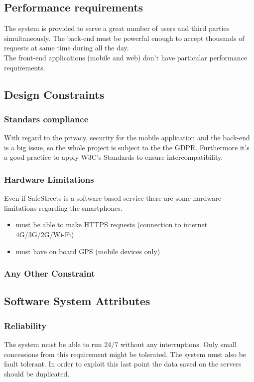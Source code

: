 \documentclass{article}
\begin{document}
\subsection{Performance requirements}
The system is provided to serve a great number of users and third parties
simultaneously. The back-end must be powerful enough to accept thousands of
requests at same time during all the day.\\
The front-end applications (mobile and web) don't have particular performance
requirements.
\subsection{Design Constraints}
\subsubsection{Standars compliance}
With regard to the privacy, security for the mobile application and the back-end
is a big issue, so the whole project is subject to the the GDPR. Furthermore
it's a good practice to apply W3C's Standards to ensure intercompatibility.
\subsubsection{Hardware Limitations}
Even if SafeStreets is a software-based service there are some hardware
limitations regarding the smartphones.
\begin{itemize}
    \item must be able to make HTTPS requests (connection to internet
    4G/3G/2G/Wi-Fi)
    \item must have on board GPS (mobile devices only)
\end{itemize}
\subsubsection{Any Other Constraint}
\subsection{Software System Attributes}
\subsubsection{Reliability}
The system must be able to run 24/7 without any interruptions. Only small
concessions from this requirement might be tolerated. The system must also be
fault tolerant. In order to exploit this last point the data saved on the
servers should be duplicated.
\end{document}
